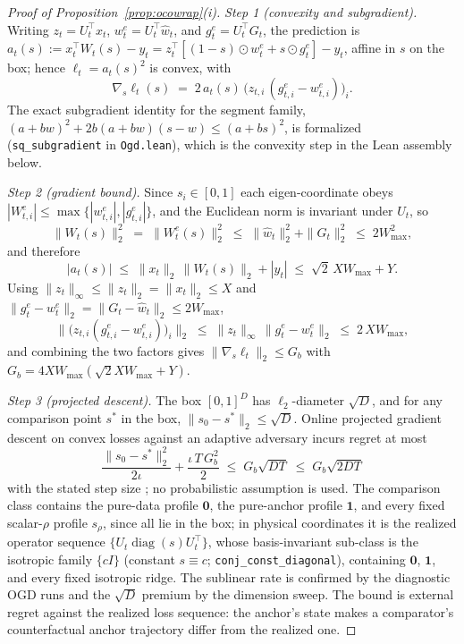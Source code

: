 \begin{proof}[Proof of Proposition~\ref{prop:ocowrap}(i)]
\emph{Step 1 (convexity and subgradient).}
Writing $z_t = U_t^\top x_t$, $w^e_t = U_t^\top \widehat w_t$, and $g^e_t = U_t^\top G_t$, the prediction is $a_t(s) := x_t^\top W_t(s) - y_t = z_t^\top[(1-s)\odot w^e_t + s\odot g^e_t] - y_t$, affine in $s$ on the box; hence $\ell_t = a_t(s)^2$ is convex, with
\[
  \nabla_s \ell_t(s) \;=\; 2\,a_t(s)\,\bigl(z_{t,i}\,(g^e_{t,i} - w^e_{t,i})\bigr)_i .
\]
The exact subgradient identity for the segment family, $(a + b w)^2 + 2b(a + bw)(s - w) \le (a + b s)^2$, is formalized (\texttt{sq\_subgradient} in \texttt{Ogd.lean}), which is the convexity step in the Lean assembly below.

\emph{Step 2 (gradient bound).}
Since $s_i \in [0,1]$ each eigen-coordinate obeys $|W^e_{t,i}| \le \max\{|w^e_{t,i}|, |g^e_{t,i}|\}$, and the Euclidean norm is invariant under $U_t$, so
\[
  \|W_t(s)\|_2^2 \;=\; \|W^e_t(s)\|_2^2 \;\le\; \|\widehat w_t\|_2^2 + \|G_t\|_2^2 \;\le\; 2W_{\max}^2,
\]
and therefore
\[
  |a_t(s)| \;\le\; \|x_t\|_2\, \|W_t(s)\|_2 + |y_t| \;\le\; \sqrt 2\, X W_{\max} + Y .
\]
Using $\|z_t\|_\infty \le \|z_t\|_2 = \|x_t\|_2 \le X$ and $\|g^e_t - w^e_t\|_2 = \|G_t - \widehat w_t\|_2 \le 2W_{\max}$,
\[
  \bigl\|\bigl(z_{t,i}(g^e_{t,i} - w^e_{t,i})\bigr)_i\bigr\|_2
  \;\le\; \|z_t\|_\infty\, \|g^e_t - w^e_t\|_2
  \;\le\; 2\,X W_{\max},
\]
and combining the two factors gives $\|\nabla_s \ell_t\|_2 \le G_b$ with $G_b = 4XW_{\max}(\sqrt 2 XW_{\max} + Y)$.

\emph{Step 3 (projected descent).}
The box $[0,1]^D$ has $\ell_2$-diameter $\sqrt D$, and for any comparison point $s^*$ in the box, $\|s_0 - s^*\|_2 \le \sqrt D$.
Online projected gradient descent on convex losses against an adaptive adversary incurs regret at most
\[
  \frac{\|s_0 - s^*\|_2^2}{2\iota} + \frac{\iota\, T\, G_b^2}{2}
  \;\le\; G_b\sqrt{DT}
  \;\le\; G_b\sqrt{2DT}
\]
with the stated step size \citep{zinkevich2003}; no probabilistic assumption is used.
The comparison class contains the pure-data profile $\mathbf 0$, the pure-anchor profile $\mathbf 1$, and every fixed scalar-$\rho$ profile $s_\rho$, since all lie in the box; in physical coordinates it is the realized operator sequence $\{U_t\operatorname{diag}(s)U_t^\top\}$, whose basis-invariant sub-class is the isotropic family $\{cI\}$ (constant $s \equiv c$; \texttt{conj\_const\_diagonal}), containing $\mathbf 0$, $\mathbf 1$, and every fixed isotropic ridge. The sublinear rate is confirmed by the diagnostic OGD runs and the $\sqrt D$ premium by the dimension sweep.
The bound is external regret against the realized loss sequence: the anchor's state makes a comparator's counterfactual anchor trajectory differ from the realized one.
\end{proof}

